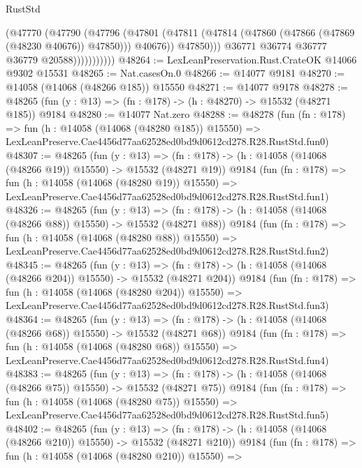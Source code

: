 \begin{lexlean}{RustStd}
\begin{coremodule}
                          (@47770
                            (@47790
                              (@47796
                                (@47801
                                  (@47811
                                    (@47814 (@47860 (@47866 (@47869 (@48230 @40676)) @47850)))
                                    @40676))
                                @47850)))
                          @36771
                          @36774
                          @36777
                          @36779
                          @20588)))))))))))
@48264 := LexLeanPreservation.Rust.CrateOK @14066 @9302 @15531
@48265 := Nat.casesOn.{0}
@48266 := @14077 @9181
@48270 := @14058 (@14068 (@48266 @185)) @15550
@48271 := @14077 @9178
@48278 := @48265 (fun (y : @13) => (fn : @178) -> (h : @48270) -> @15532 (@48271 @185)) @9184
@48280 := @14077 Nat.zero
@48288 := @48278
    (fun (fn : @178) =>
    fun (h : @14058 (@14068 (@48280 @185)) @15550) =>
    LexLeanPreserve.Cae4456d77aa62528ed0bd9d0612cd278.R28.RustStd.fun0)
@48307 := @48265
    (fun (y : @13) =>
    (fn : @178) -> (h : @14058 (@14068 (@48266 @19)) @15550) -> @15532 (@48271 @19))
    @9184
    (fun (fn : @178) =>
    fun (h : @14058 (@14068 (@48280 @19)) @15550) =>
    LexLeanPreserve.Cae4456d77aa62528ed0bd9d0612cd278.R28.RustStd.fun1)
@48326 := @48265
    (fun (y : @13) =>
    (fn : @178) -> (h : @14058 (@14068 (@48266 @88)) @15550) -> @15532 (@48271 @88))
    @9184
    (fun (fn : @178) =>
    fun (h : @14058 (@14068 (@48280 @88)) @15550) =>
    LexLeanPreserve.Cae4456d77aa62528ed0bd9d0612cd278.R28.RustStd.fun2)
@48345 := @48265
    (fun (y : @13) =>
    (fn : @178) -> (h : @14058 (@14068 (@48266 @204)) @15550) -> @15532 (@48271 @204))
    @9184
    (fun (fn : @178) =>
    fun (h : @14058 (@14068 (@48280 @204)) @15550) =>
    LexLeanPreserve.Cae4456d77aa62528ed0bd9d0612cd278.R28.RustStd.fun3)
@48364 := @48265
    (fun (y : @13) =>
    (fn : @178) -> (h : @14058 (@14068 (@48266 @68)) @15550) -> @15532 (@48271 @68))
    @9184
    (fun (fn : @178) =>
    fun (h : @14058 (@14068 (@48280 @68)) @15550) =>
    LexLeanPreserve.Cae4456d77aa62528ed0bd9d0612cd278.R28.RustStd.fun4)
@48383 := @48265
    (fun (y : @13) =>
    (fn : @178) -> (h : @14058 (@14068 (@48266 @75)) @15550) -> @15532 (@48271 @75))
    @9184
    (fun (fn : @178) =>
    fun (h : @14058 (@14068 (@48280 @75)) @15550) =>
    LexLeanPreserve.Cae4456d77aa62528ed0bd9d0612cd278.R28.RustStd.fun5)
@48402 := @48265
    (fun (y : @13) =>
    (fn : @178) -> (h : @14058 (@14068 (@48266 @210)) @15550) -> @15532 (@48271 @210))
    @9184
    (fun (fn : @178) =>
    fun (h : @14058 (@14068 (@48280 @210)) @15550) =>

\end{coremodule}
\end{lexlean}

